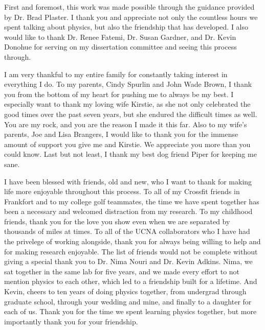 \documentclass[final]{ukthesis}
\begin{document}
\begin{acknowledgments}
  First and foremost, this work was made possible through the
  guidance provided by Dr. Brad Plaster. I thank you and appreciate not only the countless
  hours we spent talking about physics, but also the friendship that has developed. I also would
  like to thank Dr. Renee Fatemi, Dr. Susan Gardner, and Dr. Kevin Donohue for serving on
  my dissertation committee and seeing this process through. 

  I am very thankful to my entire family for constantly taking interest in everything I do.
  To my parents, Cindy Spurlin and John Wade Brown, I thank you from the bottom of
  my heart for pushing me to always be my best. I especially want to thank my loving
  wife Kirstie, as she not only celebrated the good times over the past seven years, but she
  endured the difficult times as well. You are my rock, and you are the reason I made it
  this far. Also to my wife's parents, Joe and Lisa Brangers, I would like to thank you for
  the immense amount of support you give me and Kirstie. We appreciate you more than you could know.
  Last but not least, I thank my best dog friend Piper for keeping me sane.

  I have been blessed with friends, old and new, who I want to thank for making life more enjoyable
  throughout this process.
  To all of my Crossfit friends in Frankfort and to my college golf teammates, the time
  we have spent together has been a necessary and welcomed distraction from my research. To my
  childhood friends, thank you for the love you show even when we are separated by thousands of miles
  at times. To all of the UCNA collaborators who I have had the privelege of working alongside,
  thank you for always being willing to help and for making research enjoyable.
  The list of friends would not be complete without giving a special thank you to Dr. Nima Nouri
  and Dr. Kevin Adkins. Nima, we sat together in the same lab for five years, and we made every effort
  to not mention physics to each other, which led to a friendship built for a lifetime.
  And Kevin, cheers to ten years of doing physics together, from
  undergrad through graduate school, through your wedding and mine, and finally to a daughter for each
  of us. Thank you for the time we spent learning physics together, but more importantly thank you for
  your friendship.
  
\end{acknowledgments}

\tableofcontents\clearpage
\listoffigures\clearpage
\listoftables\clearpage
\end{document}
